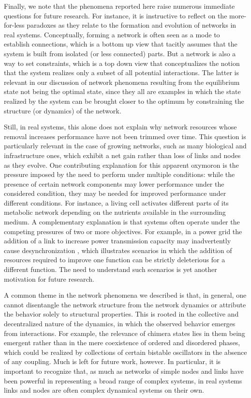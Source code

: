\documentclass[
preprint,
superscriptaddress,
aps,
prl,
]{revtex4-1}
\begin{document}
{\color{black}
Finally, we note that the phenomena reported here  raise numerous immediate questions for future research.
For instance,
it is instructive to reflect on the more-for-less 
paradoxes
as they relate to the formation and evolution of networks in real systems.
Conceptually, forming a network is often seen as a mode to establish connections, which is a bottom up view that tacitly assumes that the system is built from isolated (or less connected) parts. But a network is also a way to set constraints, which is a top down view that conceptualizes the notion that the system realizes only 
a subset
of all potential interactions.  
The latter
 is relevant in our discussion of network phenomena resulting from the equilibrium state not being the optimal state, since they all are examples in which the  
 state
 realized by the system can be brought closer to the optimum by constraining the structure (or dynamics) of the network.  


Still, in real systems,
this alone does not explain why  network resources  whose removal increases performance have not been trimmed over time. 
This question is particularly relevant
in the case of
growing networks, 
such as many biological and infrastructure ones, 
which   
exhibit a net gain rather than loss of
links and nodes as they evolve.
One contributing explanation for this apparent oxymoron is the
pressure imposed by 
the need to perform under
multiple
conditions: while the presence of certain network components may lower performance under the considered condition, they may be needed for improved performance under different conditions. 
 For instance, a living cell activates different parts of its metabolic network depending on the nutrients available in the surrounding medium.
A complementary explanation is that systems often operate under the competing pressures of two or more objectives.
 For example,
 in a power grid the addition of a link to increase power transmission capacity may inadvertently cause desynchronization  \cite{witthaut2012braess}, 
 which illustrates scenarios in which the addition of resources required to improve one function can be strictly deleterious for a different function. The need to understand such scenarios is yet another motivation for future research.
}


A common theme in the network phenomena {\color{black} we}
described
is that, {\color{black} in general, one}
cannot disentangle the network structure from the network dynamics
or attribute the behavior solely to structural properties. This is rooted in the collective and decentralized nature of the dynamics, in which the observed behavior emerges  from interactions.  For example, the relevance of chimera states lies in them being emergent rather than in the mere coexistence of ordered and disordered phases,
which
could be realized by collections of certain bistable oscillators in the absence of any coupling. Much is left for future work, however. 
{\color{black} In particular,} it is important to recognize that,
as much as networks of {\color{black} simple} nodes and links have been powerful in representing a broad range of  complex systems, 
in real systems links and nodes are often complex dynamical systems on their own.
\end{document}
